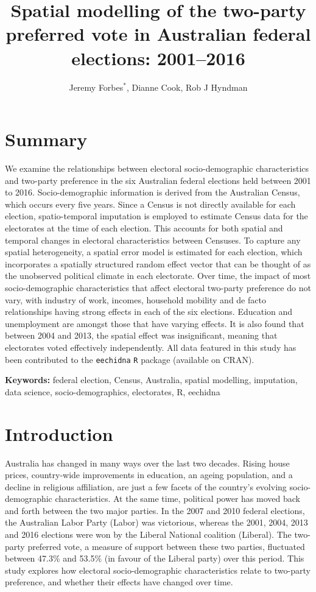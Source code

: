 \documentclass[times, doublespace]{anzsauth}
\title{Spatial modelling of the two-party preferred vote in Australian federal elections: 2001--2016}
\author{Jeremy Forbes\(^*\), Dianne Cook, Rob J Hyndman}
\date{}
\let\oldmaketitle\maketitle
\def\maketitle{\cleanlookdateon\oldmaketitle}
\begin{document}
\maketitle

\hypertarget{summary}{%
\section*{Summary}\label{summary}}

We examine the relationships between electoral socio-demographic characteristics and two-party preference in the six Australian federal elections held between 2001 to 2016. Socio-demographic information is derived from the Australian Census, which occurs every five years. Since a Census is not directly available for each election, spatio-temporal imputation is employed to estimate Census data for the electorates at the time of each election. This accounts for both spatial and temporal changes in electoral characteristics between Censuses. To capture any spatial heterogeneity, a spatial error model is estimated for each election, which incorporates a spatially structured random effect vector that can be thought of as the unobserved political climate in each electorate. Over time, the impact of most socio-demographic characteristics that affect electoral two-party preference do not vary, with industry of work, incomes, household mobility and de facto relationships having strong effects in each of the six elections. Education and unemployment are amongst those that have varying effects. It is also found that between 2004 and 2013, the spatial effect was insignificant, meaning that electorates voted effectively independently. All data featured in this study has been contributed to the \texttt{eechidna} \texttt{R} package (available on CRAN).

\textbf{Keywords:} federal election, Census, Australia, spatial modelling, imputation, data science, socio-demographics, electorates, R, eechidna

\hypertarget{intro}{%
\section{Introduction}\label{intro}}

Australia has changed in many ways over the last two decades. Rising house prices, country-wide improvements in education, an ageing population, and a decline in religious affiliation, are just a few facets of the country's evolving socio-demographic characteristics. At the same time, political power has moved back and forth between the two major parties. In the 2007 and 2010 federal elections, the Australian Labor Party (Labor) was victorious, whereas the 2001, 2004, 2013 and 2016 elections were won by the Liberal National coalition (Liberal). The two-party preferred vote, a measure of support between these two parties, fluctuated between 47.3\% and 53.5\% (in favour of the Liberal party) over this period. This study explores how electoral socio-demographic characteristics relate to two-party preference, and whether their effects have changed over time.
\end{document}
